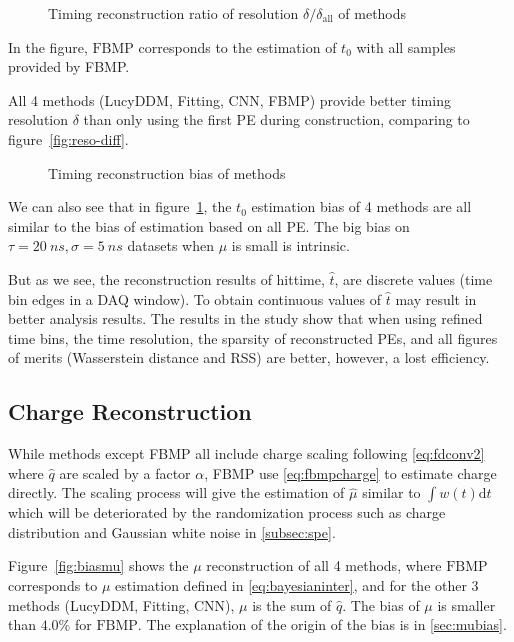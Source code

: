 \begin{figure}[H]
    \centering
    \resizebox{\textwidth}{!}{}
    \caption{\label{fig:deltamethods} Timing reconstruction ratio of resolution $\delta/\delta_{\mathrm{all}}$ of methods}
\end{figure}

In the figure, $\mathrm{FBMP}$ corresponds to the estimation of $t_{0}$ with all samples provided by FBMP. 

All 4 methods (LucyDDM, Fitting, CNN, FBMP) provide better timing resolution $\delta$ than only using the first PE during construction, comparing to figure~\ref{fig:reso-diff}. 

\begin{figure}[H]
    \centering
    \resizebox{\textwidth}{!}{}
    \caption{\label{fig:biasmethods}Timing reconstruction bias of methods}
\end{figure}

We can also see that in figure~\ref{fig:deltamethods}, the $t_0$ estimation bias of 4 methods are all similar to the bias of estimation based on all PE. The big bias on $\tau=\SI{20}{ns}, \sigma=\SI{5}{ns}$ datasets when $\mu$ is small is intrinsic. 


But as we see, the reconstruction results of hittime, $\hat{t}$, are discrete values (time bin edges in a DAQ window). To obtain continuous values of $\hat{t}$ may result in better analysis results. The results in the study show that when using refined time bins, the time resolution, the sparsity of reconstructed PEs, and all figures of merits (Wasserstein distance and RSS) are better, however, a lost efficiency. 

\subsection{Charge Reconstruction}
\label{subsec:chargereconstruction}

While methods except FBMP all include charge scaling following \eqref{eq:fdconv2} where $\hat{q}$ are scaled by a factor $\alpha$, FBMP use \eqref{eq:fbmpcharge} to estimate charge directly. The scaling process will give the estimation of $\hat{\mu}$ similar to $\int w(t)\mathrm{d}t$ which will be deteriorated by the randomization process such as charge distribution and Gaussian white noise in \ref{subsec:spe}. 

Figure~\ref{fig:biasmu} shows the $\mu$ reconstruction of all 4 methods, where $\mathrm{FBMP}$ corresponds to $\mu$ estimation defined in \eqref{eq:bayesianinter}, and for the other 3 methods (LucyDDM, Fitting, CNN), $\mu$ is the sum of $\hat{q}$. The bias of $\mu$ is smaller than $4.0\%$ for $\mathrm{FBMP}$. The explanation of the origin of the bias is in \ref{sec:mubias}. 

